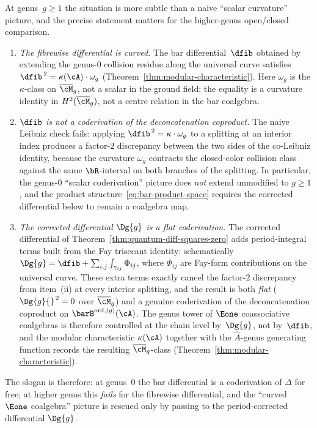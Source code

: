 \begin{remark}
\label{rem:sc-higher-genus}
At genus~$g \geq 1$ the situation is more subtle than a naive
``scalar curvature'' picture, and the precise statement
matters for the higher-genus open/closed comparison.
\begin{enumerate}[label=\textup{(\roman*)}]
\item \emph{The fibrewise differential is curved.} The bar
 differential~$\dfib$ obtained by extending the genus-$0$
 collision residue along the universal curve satisfies
 $\dfib^{\,2} = \kappa(\cA)\cdot\omega_g$
 (Theorem~\ref{thm:modular-characteristic}). Here $\omega_g$ is
 the $\kappa$-class on $\overline{\cM}_g$, not a scalar in the
 ground field; the equality is a curvature identity in
 $H^2(\overline{\cM}_g)$, not a centre relation in the bar
 coalgebra.
\item \emph{$\dfib$ is \emph{not} a coderivation of the
 deconcatenation coproduct.} The naive Leibniz check
 fails: applying $\dfib^{\,2} = \kappa\cdot\omega_g$ to a
 splitting at an interior index produces a factor-$2$
 discrepancy between the two sides of the co-Leibniz identity,
 because the curvature $\omega_g$ contracts the closed-color
 collision class against the same $\bR$-interval on both
 branches of the splitting. In particular, the genus-$0$
 ``scalar coderivation'' picture does \emph{not} extend
 unmodified to $g\geq 1$, and the product
 structure~\eqref{eq:bar-product-space} requires the corrected
 differential below to remain a coalgebra map.
\item \emph{The corrected differential
 $\Dg{g}$ \textup{is} a flat coderivation.} The corrected
 differential of Theorem~\ref{thm:quantum-diff-squares-zero}
 adds period-integral terms built from the Fay trisecant
 identity: schematically
 $\Dg{g} = \dfib + \sum_{i,j}\int_{\gamma_{ij}}\Phi_{ij}$,
 where $\Phi_{ij}$ are Fay-form contributions on the universal
 curve. These extra terms exactly cancel the factor-$2$
 discrepancy from item~(ii) at every interior splitting, and the
 result is both \emph{flat}
 ($\Dg{g}{}^{\,2} = 0$ over $\overline{\cM}_g$) and a genuine
 coderivation of the deconcatenation coproduct on
 $\barB^{\mathrm{ord},(g)}(\cA)$. The genus tower of
 $\Eone$ coassociative coalgebras is therefore controlled at the chain
 level by~$\Dg{g}$, not by~$\dfib$, and the modular
 characteristic $\kappa(\cA)$ together with the $\hat A$-genus
 generating function records the resulting
 $\overline{\cM}_g$-class
 (Theorem~\ref{thm:modular-characteristic}).
\end{enumerate}
The slogan is therefore: at genus~$0$ the bar differential is a
coderivation of $\Delta$ for free; at higher genus this
\emph{fails} for the fibrewise differential, and the ``curved
$\Eone$ coalgebra'' picture is rescued only by passing to the
period-corrected differential $\Dg{g}$.
\end{remark}

